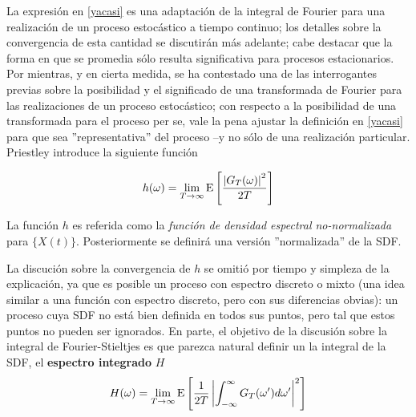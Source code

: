 La expresi\'on en \ref{yacasi} es una adaptaci\'on de la integral de Fourier para una realizaci\'on
de un proceso estoc\'astico a tiempo continuo; los detalles sobre la convergencia de esta 
cantidad se discutir\'an m\'as adelante;
cabe destacar que la forma en que se promedia s\'olo resulta significativa para procesos estacionarios.
Por mientras, y en cierta medida, se ha contestado una de las interrogantes 
previas
sobre la posibilidad y
el significado de una transformada de Fourier para las realizaciones de un proceso 
estoc\'astico; con respecto a la posibilidad de una transformada para el proceso per se, vale la 
pena
ajustar la definici\'on en \ref{yacasi} para que sea ''representativa'' del proceso --y no s\'olo
de una realizaci\'on particular. Priestley introduce la siguiente funci\'on

\begin{equation}
h(\omega) = \lim_{T\rightarrow \infty} \mathrm{E}\left[  \frac{ \left| G_T(\omega) \right|^{2}}{2 T}  \right]
\end{equation}

La funci\'on $h$ es referida como la \textit{funci\'on de densidad espectral no-normalizada} para
$\{X(t)\}$. Posteriormente se definir\'a una versi\'on ''normalizada'' de la SDF.

La discuci\'on sobre la convergencia de $h$ se omiti\'o por tiempo y simpleza de la explicaci\'on,
ya que es posible un proceso con espectro discreto o mixto (una idea similar a una funci\'on 
con espectro discreto, pero con sus diferencias obvias):
un proceso cuya SDF no est\'a bien definida en 
todos sus puntos, pero tal que estos puntos no pueden ser ignorados.
En parte, el objetivo de la discusi\'on sobre la integral de Fourier-Stieltjes es que parezca
natural definir un la integral de la SDF, el \textbf{espectro integrado} $H$
\begin{equation*}
H(\omega) = \lim_{T\rightarrow \infty} 
\mathrm{E}\left[  \frac{1}{2 T} \left| \int_{-\infty}^{\infty} G_T(\omega^{\prime}) d\omega^{\prime} \right|^{2}  \right]
\end{equation*}

